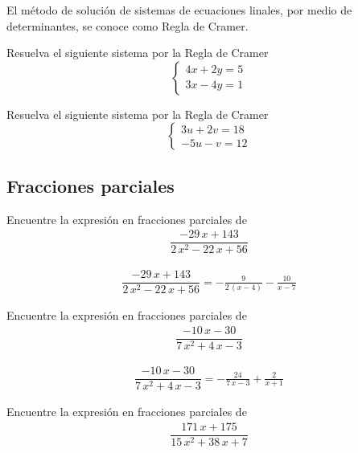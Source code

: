 El m\'etodo de soluci\'on de sistemas de ecuaciones linales, por medio de determinantes, se conoce como Regla de Cramer.



\begin{problema} Resuelva el siguiente sistema por la Regla de Cramer
	\label{spi:28.4a}
	$$
	\begin{cases}
		4x+2y=5\\
		3x-4y=1
	\end{cases}
	$$
\end{problema}




\begin{problema} Resuelva el siguiente sistema por la Regla de Cramer
	\label{spi:28.4b}
	$$
	\begin{cases}
		3u+2v=18\\
		-5u-v=12
	\end{cases}
	$$
\end{problema}


\subsection*{Fracciones parciales}

{}
\begin{problema}
	Encuentre la expresión en fracciones parciales de
	\begin{align*}
		\dfrac{-29 \, x + 143}{2 \, x^{2} - 22 \, x + 56}
	\end{align*}
\end{problema}

\begin{align*}
	\dfrac{-29 \, x + 143}{2 \, x^{2} - 22 \, x + 56}= -\frac{9}{2 \, {\left(x - 4\right)}} - \frac{10}{x - 7}
\end{align*}


{}
\begin{problema}
	Encuentre la expresión en fracciones parciales de
	\begin{align*}
		\dfrac{-10 \, x - 30}{7 \, x^{2} + 4 \, x - 3}
	\end{align*}
\end{problema}

\begin{align*}
	\dfrac{-10 \, x - 30}{7 \, x^{2} + 4 \, x - 3}= -\frac{24}{7 \, x - 3} + \frac{2}{x + 1}
\end{align*}


{}
\begin{problema}
	Encuentre la expresión en fracciones parciales de
	\begin{align*}
		\dfrac{171 \, x + 175}{15 \, x^{2} + 38 \, x + 7}
	\end{align*}
\end{problema}

